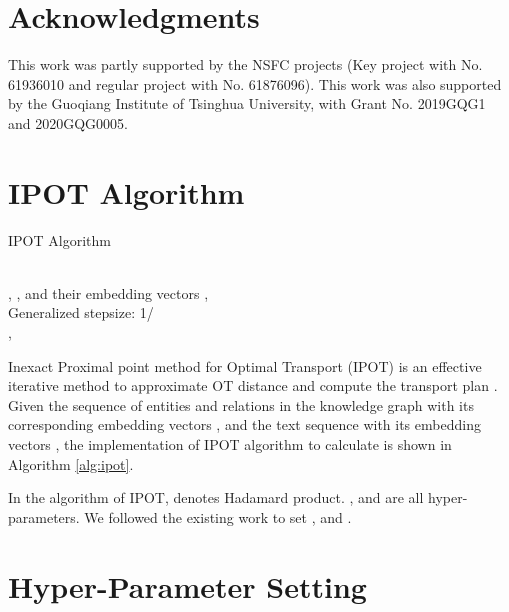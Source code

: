 \documentclass[11pt,a4paper]{article}
\begin{document}
\section*{Acknowledgments}

This work was partly supported by the NSFC projects (Key project with No. 61936010 and regular project with No. 61876096). This work was also supported by the Guoqiang Institute of Tsinghua University, with Grant No. 2019GQG1 and 2020GQG0005. 




\appendix

\section{IPOT Algorithm}
\label{app:ipot}

\begin{algorithm}[htb] 
\caption{IPOT Algorithm} 
\label{alg:ipot} 
\begin{algorithmic}[1]
\REQUIRE ~~\\
, , and their embedding vectors ,   \\
Generalized stepsize: 1/ \\
\STATE , 
\STATE 
\STATE 
{}
\STATE 
{}
\STATE 
\ENDFOR
\STATE 
\ENDFOR
\RETURN 
\end{algorithmic}
\end{algorithm}

Inexact Proximal point method for Optimal Transport (IPOT) is an effective iterative method to approximate OT distance and compute the transport plan  \cite{xie2019ipot}. Given the sequence of entities and relations in the knowledge graph  with its corresponding embedding vectors , and the text sequence  with its embedding vectors , the implementation of IPOT algorithm to calculate  is shown in Algorithm \ref{alg:ipot}.

In the algorithm of IPOT,  denotes Hadamard product. ,  and  are all hyper-parameters. We followed the existing work \cite{chen2020got} to set ,  and .


\section{Hyper-Parameter Setting}
\label{app:hyperparam}
\end{document}
